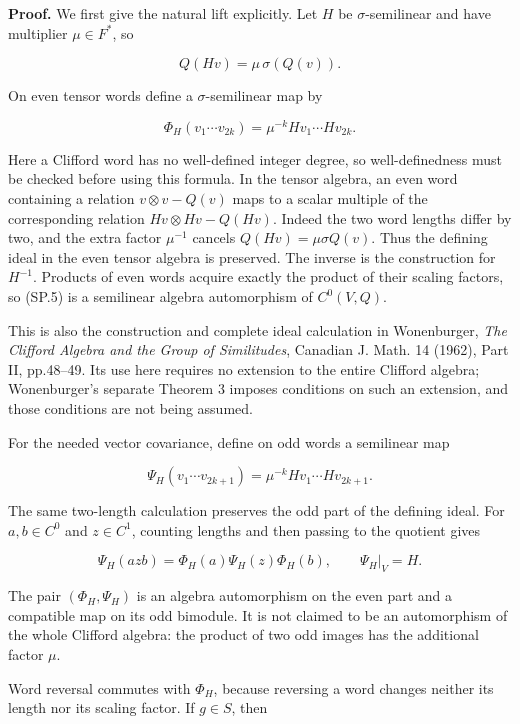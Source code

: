 \textbf{Proof.} We first give the natural lift explicitly. Let \(H\) be \(\sigma\)-semilinear and have multiplier \(\mu\in F^*\), so

\[
 Q(Hv)=\mu\,\sigma(Q(v)).
 \tag{SP.4}
\]

On even tensor words define a \(\sigma\)-semilinear map by

\[
 \Phi_H(v_1\cdots v_{2k})
 =\mu^{-k}Hv_1\cdots Hv_{2k}.
 \tag{SP.5}
\]

Here a Clifford word has no well-defined integer degree, so well-definedness must be checked before using this formula. In the tensor algebra, an even word containing a relation \(v\otimes v-Q(v)\) maps to a scalar multiple of the corresponding relation \(Hv\otimes Hv-Q(Hv)\). Indeed the two word lengths differ by two, and the extra factor \(\mu^{-1}\) cancels \(Q(Hv)=\mu\sigma Q(v)\). Thus the defining ideal in the even tensor algebra is preserved. The inverse is the construction for \(H^{-1}\). Products of even words acquire exactly the product of their scaling factors, so (SP.5) is a semilinear algebra automorphism of \(C^0(V,Q)\).

This is also the construction and complete ideal calculation in Wonenburger, \emph{The Clifford Algebra and the Group of Similitudes}, Canadian J. Math. 14 (1962), Part II, pp.48--49. \cite[Part~II, pp.~48--49]{SF:Wonenburger1962} Its use here requires no extension to the entire Clifford algebra; Wonenburger's separate Theorem 3 imposes conditions on such an extension, and those conditions are not being assumed.

For the needed vector covariance, define on odd words a semilinear map

\[
 \Psi_H(v_1\cdots v_{2k+1})
 =\mu^{-k}Hv_1\cdots Hv_{2k+1}.
 \tag{SP.6}
\]

The same two-length calculation preserves the odd part of the defining ideal. For \(a,b\in C^0\) and \(z\in C^1\), counting lengths and then passing to the quotient gives

\[
 \Psi_H(azb)=\Phi_H(a)\Psi_H(z)\Phi_H(b),
 \qquad \Psi_H|_V=H.
 \tag{SP.7}
\]

The pair \((\Phi_H,\Psi_H)\) is an algebra automorphism on the even part and a compatible map on its odd bimodule. It is not claimed to be an automorphism of the whole Clifford algebra: the product of two odd images has the additional factor \(\mu\).

Word reversal commutes with \(\Phi_H\), because reversing a word changes neither its length nor its scaling factor. If \(g\in S\), then

